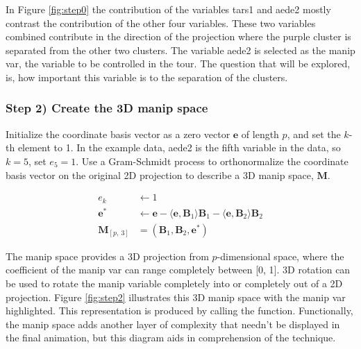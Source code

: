 In Figure \ref{fig:step0} the contribution of the variables tars1 and
aede2 mostly contrast the contribution of the other four variables.
These two variables combined contribute in the direction of the
projection where the purple cluster is separated from the other two
clusters. The variable aede2 is selected as the manip var, the variable
to be controlled in the tour. The question that will be explored, is,
how important this variable is to the separation of the clusters.

\hypertarget{step-2-create-the-3d-manip-space}{%
\subsubsection{Step 2) Create the 3D manip
space}\label{step-2-create-the-3d-manip-space}}

Initialize the coordinate basis vector as a zero vector \(\textbf{e}\)
of length \(p\), and set the \(k\)-th element to 1. In the example data,
aede2 is the fifth variable in the data, so \(k=5\), set \(e_5=1\). Use
a Gram-Schmidt process to orthonormalize the coordinate basis vector on
the original 2D projection to describe a 3D manip space, \(\textbf{M}\).

\begin{align*}
  e_k &\leftarrow 1 \\ 
  \textbf{e}^*   &\leftarrow \textbf{e} - \langle \textbf{e}, \textbf{B}_1 \rangle \textbf{B}_1 - \langle \textbf{e}, \textbf{B}_2 \rangle \textbf{B}_2 \\ 
  \textbf{M}_{[p,~3]} &= (\textbf{B}_1,\textbf{B}_2,\textbf{e}^*)
\end{align*}

The manip space provides a 3D projection from \(p\)-dimensional space,
where the coefficient of the manip var can range completely between
{[}0, 1{]}. 3D rotation can be used to rotate the manip variable
completely into or completely out of a 2D projection. Figure
\ref{fig:step2} illustrates this 3D manip space with the manip var
highlighted. This representation is produced by calling the
 function. Functionally, the manip space adds
another layer of complexity that needn't be displayed in the final
animation, but this diagram aids in comprehension of the technique.

